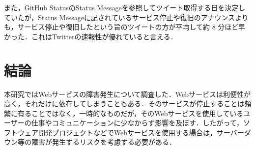 \documentclass[uplatex,twocolumn]{jsarticle}
\begin{document}
また，GitHub StatusのStatus Messageを参照してツイート取得する日を決定していたが，Status Messageに記されているサービス停止や復旧のアナウンスよりも，サービス停止や復旧したという旨のツイートの方が平均して約 8 分ほど早かった．これはTwitterの速報性が優れていると言える．

\section{結論}
本研究ではWebサービスの障害発生について調査した．Webサービスは利便性が高く，それだけに依存してしまうこともある．そのサービスが停止することは頻繁に有ることではなく，一時的なものだが，そのWebサービスを使用しているユーザーの仕事やコミュニケーションに少なからず影響を及ぼす．したがって，ソフトウェア開発プロジェクトなどでWebサービスを使用する場合は，サーバーダウン等の障害が発生するリスクを考慮する必要がある．


\end{document}
